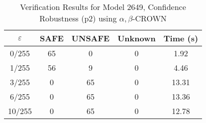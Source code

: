 \begin{table}[htbp]
\centering
\caption{Verification Results for Model 2649, Confidence Robustness (p2) using $\alpha,\beta$-CROWN}
\label{tab:model2649_p2_abcrown}
\begin{tabular}{|c|c|c|c|c|}
\hline
$\varepsilon$ & SAFE & UNSAFE & Unknown & Time (s) \\ \hline
0/255 & 65 & 0 & 0 & 1.92 \\ \hline
1/255 & 56 & 9 & 0 & 4.46 \\ \hline
3/255 & 0 & 65 & 0 & 13.31 \\ \hline
6/255 & 0 & 65 & 0 & 13.36 \\ \hline
10/255 & 0 & 65 & 0 & 12.78 \\ \hline
\end{tabular}
\end{table}
